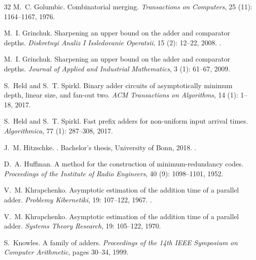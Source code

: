 \begin{thebibliography}{32}
M.~C. Golumbic.
\newblock Combinatorial merging.
\newblock \emph{Transactions on Computers}, 25 (11):
  1164--1167, 1976.

M.~I. Grinchuk.
\newblock Sharpening an upper bound on the adder and comparator depths.
\newblock \emph{Diskretnyi Analiz I Issledovanie Operatsii}, 15
  (2): 12--22, 2008.
 \cite{GrinchukEng}.

M.~I. Grinchuk.
\newblock Sharpening an upper bound on the adder and comparator depths.
\newblock \emph{Journal of Applied and Industrial Mathematics}, 3
  (1): 61--67, 2009.

S.~Held and S.~T. Spirkl.
\newblock Binary adder circuits of asymptotically minimum depth, linear size,
  and fan-out two.
\newblock \emph{ACM Transactions on Algorithms}, 14 (1):
  1--18, 2017{}.

S.~Held and S.~T. Spirkl.
\newblock Fast prefix adders for non-uniform input arrival times.
\newblock \emph{Algorithmica}, 77 (1): 287--308,
  2017{}.

J.~M. Hitzschke.
.
\newblock Bachelor's thesis, University of Bonn, 2018.
.

D.~A. Huffman.
\newblock A method for the construction of minimum-redundancy codes.
\newblock \emph{Proceedings of the Institute of Radio Engineers}, 40
  (9): 1098--1101, 1952.

V.~M. Khrapchenko.
\newblock Asymptotic estimation of the addition time of a parallel adder.
\newblock \emph{Problemy Kibernetiki}, 19: 107--122, 1967.
 \cite{Khrapchenko-construction-eng}.

V.~M. Khrapchenko.
\newblock Asymptotic estimation of the addition time of a parallel adder.
\newblock \emph{Systems Theory Research}, 19: 105--122, 1970.

S.~Knowles.
\newblock A family of adders.
\newblock \emph{Proceedings of the 14th IEEE Symposium on Computer Arithmetic},
  pages 30--34, 1999.


\end{thebibliography}
